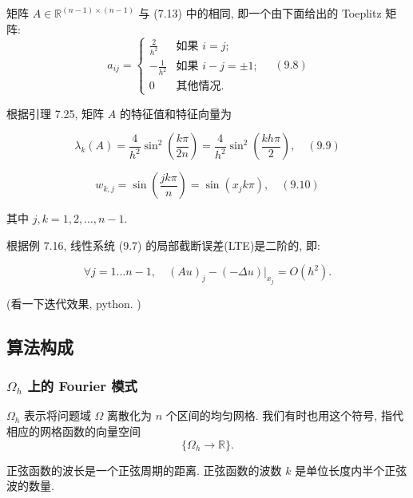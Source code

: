 \documentclass[a4paper]{ctexart}
\newcommand{\hl}[1]
{\noindent {\bf {#1}}}
\begin{document}
{\begin{figure}[h]
  \centering
\end{figure}

矩阵 $A \in \mathbb{R}^{(n-1) \times (n-1)}$ 与 (7.13) 中的相同, 
即一个由下面给出的 Toeplitz 矩阵:
$$ 
a_{ij} = \begin{cases} 
\frac{2}{h^2} & \text{如果 } i = j; \\ 
-\frac{1}{h^2} & \text{如果 } i - j = \pm1; \\ 
0 & \text{其他情况}. 
\end{cases} \quad (9.8) 
$$

根据引理 7.25, 矩阵 $A$ 的特征值和特征向量为

$$
\lambda_k(A) = \frac{4}{h^2} \sin^2\left(\frac{k\pi}{2n}\right) 
= \frac{4}{h^2} \sin^2\left(\frac{kh\pi}{2}\right), \quad (9.9) 
$$

$$
w_{k,j} = \sin\left(\frac{jk\pi}{n}\right) = \sin(x_{j}k\pi), \quad (9.10) 
$$

其中 $j, k = 1, 2, \ldots, n - 1$.

根据例 7.16, 线性系统 (9.7) 的局部截断误差(LTE)是二阶的, 即:

$$
\forall j = 1 \ldots n-1, \quad (Au)_j - (-\Delta u)|_{x_j} = O(h^2). 
$$

(看一下迭代效果, python. )


\subsection{算法构成}

\subsubsection{$\Omega_h$ 上的 Fourier 模式}

\hl{符号 7} $\Omega_h$ 表示将问题域 $\Omega$ 离散化为 $n$ 个区间的均匀网格. 
我们有时也用这个符号, 指代相应的网格函数的向量空间 
$$
\{\Omega_h \rightarrow \mathbb{R}\}.
$$


\hl{定义 9.9} 正弦函数的波长是一个正弦周期的距离. 
正弦函数的波数 $k$ 是单位长度内半个正弦波的数量.

}
\end{document}
